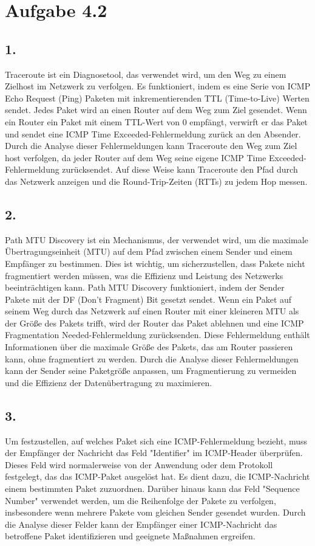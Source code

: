 \documentclass[a4paper]{scrartcl}
\begin{document}
\section*{Aufgabe 4.2}
\subsection*{1.}
Traceroute ist ein Diagnosetool, das verwendet wird, um den Weg zu einem Zielhost im Netzwerk zu verfolgen. Es funktioniert, indem es eine Serie von ICMP Echo Request (Ping) Paketen mit inkrementierenden TTL (Time-to-Live) Werten sendet. Jedes Paket wird an einen Router auf dem Weg zum Ziel gesendet. Wenn ein Router ein Paket mit einem TTL-Wert von 0 empfängt, verwirft er das Paket und sendet eine ICMP Time Exceeded-Fehlermeldung zurück an den Absender. Durch die Analyse dieser Fehlermeldungen kann Traceroute den Weg zum Ziel host verfolgen, da jeder Router auf dem Weg seine eigene ICMP Time Exceeded-Fehlermeldung zurücksendet. Auf diese Weise kann Traceroute den Pfad durch das Netzwerk anzeigen und die Round-Trip-Zeiten (RTTs) zu jedem Hop messen.
\subsection*{2.}
Path MTU Discovery ist ein Mechanismus, der verwendet wird, um die maximale Übertragungseinheit (MTU) auf dem Pfad zwischen einem Sender und einem Empfänger zu bestimmen. Dies ist wichtig, um sicherzustellen, dass Pakete nicht fragmentiert werden müssen, was die Effizienz und Leistung des Netzwerks beeinträchtigen kann. Path MTU Discovery funktioniert, indem der Sender Pakete mit der DF (Don't Fragment) Bit gesetzt sendet. Wenn ein Paket auf seinem Weg durch das Netzwerk auf einen Router mit einer kleineren MTU als der Größe des Pakets trifft, wird der Router das Paket ablehnen und eine ICMP Fragmentation Needed-Fehlermeldung zurücksenden. Diese Fehlermeldung enthält Informationen über die maximale Größe des Pakets, das am Router passieren kann, ohne fragmentiert zu werden. Durch die Analyse dieser Fehlermeldungen kann der Sender seine Paketgröße anpassen, um Fragmentierung zu vermeiden und die Effizienz der Datenübertragung zu maximieren.
\subsection*{3.}
Um festzustellen, auf welches Paket sich eine ICMP-Fehlermeldung bezieht, muss der Empfänger der Nachricht das Feld "Identifier" im ICMP-Header überprüfen. Dieses Feld wird normalerweise von der Anwendung oder dem Protokoll festgelegt, das das ICMP-Paket ausgelöst hat. Es dient dazu, die ICMP-Nachricht einem bestimmten Paket zuzuordnen. Darüber hinaus kann das Feld "Sequence Number" verwendet werden, um die Reihenfolge der Pakete zu verfolgen, insbesondere wenn mehrere Pakete vom gleichen Sender gesendet wurden. Durch die Analyse dieser Felder kann der Empfänger einer ICMP-Nachricht das betroffene Paket identifizieren und geeignete Maßnahmen ergreifen.
\end{document}
